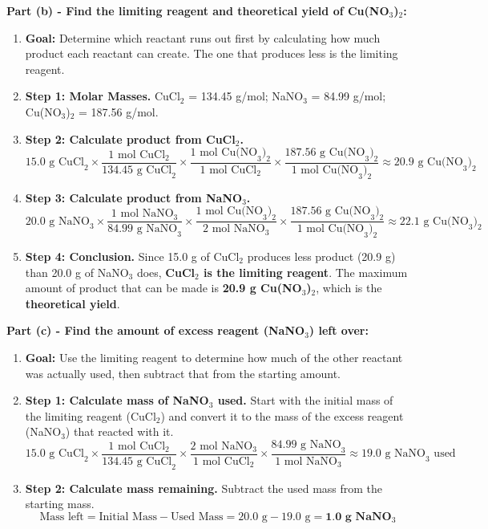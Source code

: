 \documentclass{article}
\begin{document}
\textbf{Part (b) - Find the limiting reagent and theoretical yield of Cu(NO\(_3\))\(_2\):}
\begin{enumerate}[itemsep=5pt]
    \item \textbf{Goal:} Determine which reactant runs out first by calculating how much product each reactant can create. The one that produces less is the limiting reagent.
    \item \textbf{Step 1: Molar Masses.} CuCl\(_2\) = 134.45 g/mol; NaNO\(_3\) = 84.99 g/mol; Cu(NO\(_3\))\(_2\) = 187.56 g/mol.
    \item \textbf{Step 2: Calculate product from CuCl\(_2\).}
    \[ 15.0 \text{ g CuCl}_2 \times \frac{1 \text{ mol CuCl}_2}{134.45 \text{ g CuCl}_2} \times \frac{1 \text{ mol Cu(NO}_3)_2}{1 \text{ mol CuCl}_2} \times \frac{187.56 \text{ g Cu(NO}_3)_2}{1 \text{ mol Cu(NO}_3)_2} \approx 20.9 \text{ g Cu(NO}_3)_2 \]
    \item \textbf{Step 3: Calculate product from NaNO\(_3\).}
    \[ 20.0 \text{ g NaNO}_3 \times \frac{1 \text{ mol NaNO}_3}{84.99 \text{ g NaNO}_3} \times \frac{1 \text{ mol Cu(NO}_3)_2}{2 \text{ mol NaNO}_3} \times \frac{187.56 \text{ g Cu(NO}_3)_2}{1 \text{ mol Cu(NO}_3)_2} \approx 22.1 \text{ g Cu(NO}_3)_2 \]
    \item \textbf{Step 4: Conclusion.} Since 15.0 g of CuCl\(_2\) produces less product (20.9 g) than 20.0 g of NaNO\(_3\) does, \textbf{CuCl\(_2\) is the limiting reagent}. The maximum amount of product that can be made is \textbf{20.9 g Cu(NO\(_3\))\(_2\)}, which is the \textbf{theoretical yield}.
\end{enumerate}

\textbf{Part (c) - Find the amount of excess reagent (NaNO\(_3\)) left over:}
\begin{enumerate}[itemsep=5pt]
    \item \textbf{Goal:} Use the limiting reagent to determine how much of the other reactant was actually used, then subtract that from the starting amount.
    \item \textbf{Step 1: Calculate mass of NaNO\(_3\) used.} Start with the initial mass of the limiting reagent (CuCl\(_2\)) and convert it to the mass of the excess reagent (NaNO\(_3\)) that reacted with it.
    \[ 15.0 \text{ g CuCl}_2 \times \frac{1 \text{ mol CuCl}_2}{134.45 \text{ g CuCl}_2} \times \frac{2 \text{ mol NaNO}_3}{1 \text{ mol CuCl}_2} \times \frac{84.99 \text{ g NaNO}_3}{1 \text{ mol NaNO}_3} \approx 19.0 \text{ g NaNO}_3 \text{ used} \]
    \item \textbf{Step 2: Calculate mass remaining.} Subtract the used mass from the starting mass.
    \[ \text{Mass left} = \text{Initial Mass} - \text{Used Mass} = 20.0 \text{ g} - 19.0 \text{ g} = \textbf{1.0 g NaNO\(_3\)} \]
\end{enumerate}
\end{document}

